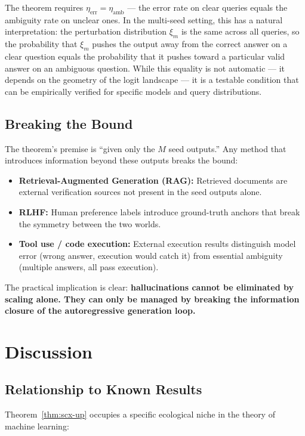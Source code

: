 \documentclass[12pt,a4paper]{article}
\theoremstyle{definition}
\theoremstyle{remark}
\begin{document}
The theorem requires $\eta_{\text{err}} = \eta_{\text{amb}}$ — the error rate on clear queries equals the ambiguity rate on unclear ones. In the multi-seed setting, this has a natural interpretation: the perturbation distribution $\xi_m$ is the same across all queries, so the probability that $\xi_m$ pushes the output away from the correct answer on a clear question equals the probability that it pushes toward a particular valid answer on an ambiguous question. While this equality is not automatic — it depends on the geometry of the logit landscape — it is a testable condition that can be empirically verified for specific models and query distributions.

\subsection{Breaking the Bound}

The theorem's premise is ``given only the $M$ seed outputs.'' Any method that introduces information beyond these outputs breaks the bound:

\begin{itemize}
\item \textbf{Retrieval-Augmented Generation (RAG):} Retrieved documents are external verification sources not present in the seed outputs alone.
\item \textbf{RLHF:} Human preference labels introduce ground-truth anchors that break the symmetry between the two worlds.
\item \textbf{Tool use / code execution:} External execution results distinguish model error (wrong answer, execution would catch it) from essential ambiguity (multiple answers, all pass execution).
\end{itemize}

The practical implication is clear: \textbf{hallucinations cannot be eliminated by scaling alone. They can only be managed by breaking the information closure of the autoregressive generation loop.}

\section{Discussion}

\subsection{Relationship to Known Results}

Theorem~\ref{thm:scx-up} occupies a specific ecological niche in the theory of machine learning:
\end{document}
